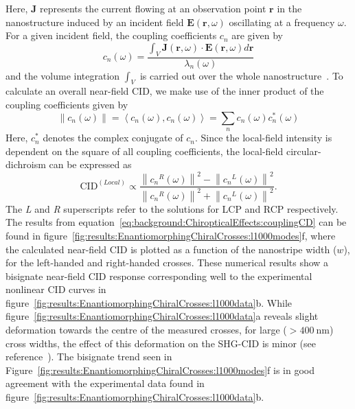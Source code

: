 Here, $\mathbf{J}$ represents the current flowing at an observation point $\mathbf{r}$ in the nanostructure induced by an incident field $\mathbf{E}(\mathbf{r}, \omega)$ oscillating at a frequency $\omega$. For a given incident field, the coupling coefficients $c_n$ are given by~\cite{Zheng2015, Zheng2014}
\begin{equation}\label{eq:background:ChiropticalEffects:couplingCoefficients}	
	c_n(\omega) = \frac{\int_{V} \mathbf{J}(\mathbf{r}, \omega) \cdot \mathbf{E}(\mathbf{r}, \omega) d\mathbf{r}}{\lambda_{n}(\omega)}
\end{equation}
and the volume integration $\int_{V}$ is carried out over the whole nanostructure~\cite{Zheng2013}. 
To calculate an overall near-field CID, we make use of the inner product of the coupling coefficients given by
\begin{equation}\label{eq:background:ChiropticalEffects:couplingInnerProduct}	
	\left\| c_{n}(\omega ) \right\| = \left\langle c_{n}(\omega),c_{n}(\omega) \right\rangle = \sum\limits_n c_{n}(\omega) c_{n}^* (\omega)
\end{equation}
Here, $c_{n}^*$ denotes the complex conjugate of $c_{n}$.
Since the local-field intensity is dependent on the square of all coupling coefficients, the local-field circular-dichroism can be expressed as
\begin{equation}\label{eq:background:ChiropticalEffects:couplingCD}	
	\mathrm{CID}^{(Local)} \propto \frac{{\left\| {{c_n}^R(\omega )} \right\|}^2 - {\left\| {{c_n}^L(\omega )} \right\|}^2}{{\left\| {{c_n}^R(\omega )} \right\|}^2 + {\left\| {{c_n}^L(\omega )} \right\|}^2}.
\end{equation}
The \textit{L} and \textit{R} superscripts refer to the solutions for LCP and RCP respectively. 
The results from equation~\ref{eq:background:ChiropticalEffects:couplingCD} can be found in figure~\ref{fig:results:EnantiomorphingChiralCrosses:l1000modes}f, where the calculated near-field CID is plotted as a function of the nanostripe width ($w$), for the left-handed and right-handed crosses. These numerical results show a bisignate near-field CID response corresponding well to the experimental nonlinear CID curves in figure~\ref{fig:results:EnantiomorphingChiralCrosses:l1000data}b. 
While figure~\ref{fig:results:EnantiomorphingChiralCrosses:l1000data}a reveals slight deformation towards the centre of the measured crosses, for large ($>\SI{400}{\nano\m}$) cross widths, the effect of this deformation on the SHG-CID is minor (see reference~\cite{Valev2014}). 
The bisignate trend seen in Figure~\ref{fig:results:EnantiomorphingChiralCrosses:l1000modes}f is in good agreement with the experimental data found in figure~\ref{fig:results:EnantiomorphingChiralCrosses:l1000data}b.

